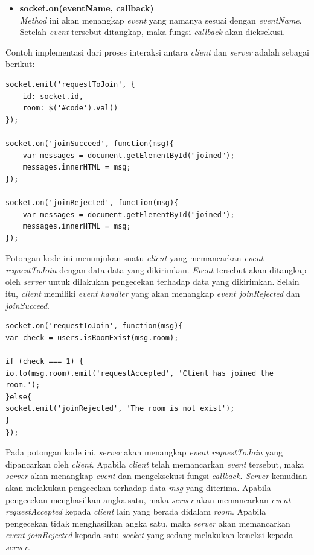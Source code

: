 \begin{enumerate}
\begin{itemize}
		\item \textbf{socket.on(eventName, callback)} \\
		\textit{Method} ini akan menangkap \textit{event} yang namanya sesuai dengan \textit{eventName}. Setelah \textit{event} tersebut ditangkap, maka fungsi \textit{callback} akan dieksekusi.
	\end{itemize}
Contoh implementasi dari proses interaksi antara \textit{client} dan \textit{server} adalah sebagai berikut:
\begin{lstlisting}[caption={potongan kode pada \textit{client}}, label={lst:interaksi_client}, captionpos=b]
socket.emit('requestToJoin', {
	id: socket.id,
	room: $('#code').val()
});

socket.on('joinSucceed', function(msg){
	var messages = document.getElementById("joined");
	messages.innerHTML = msg;
});

socket.on('joinRejected', function(msg){
	var messages = document.getElementById("joined");
	messages.innerHTML = msg;
});
\end{lstlisting}
Potongan kode ini menunjukan suatu \textit{client} yang memancarkan \textit{event requestToJoin} dengan data-data yang dikirimkan. \textit{Event} tersebut akan ditangkap oleh \textit{server} untuk dilakukan pengecekan terhadap data yang dikirimkan. Selain itu, \textit{client} memiliki \textit{event handler} yang akan menangkap \textit{event joinRejected} dan \textit{joinSucceed}.


\begin{lstlisting}[caption={potongan kode pada \textit{server}}, label={lst:interaksi_server}, captionpos=b]
socket.on('requestToJoin', function(msg){
var check = users.isRoomExist(msg.room);

if (check === 1) {
io.to(msg.room).emit('requestAccepted', 'Client has joined the room.');
}else{
socket.emit('joinRejected', 'The room is not exist');
}
});
\end{lstlisting}
Pada potongan kode ini, \textit{server} akan menangkap \textit{event requestToJoin} yang dipancarkan oleh \textit{client}. Apabila \textit{client} telah memancarkan \textit{event} tersebut, maka \textit{server} akan menangkap \textit{event} dan mengeksekusi fungsi \textit{callback}. \textit{Server} kemudian akan melakukan pengecekan terhadap data \textit{msg} yang diterima. Apabila pengecekan menghasilkan angka satu, maka \textit{server} akan memancarkan \textit{event requestAccepted} kepada \textit{client} lain yang berada didalam \textit{room}. Apabila pengecekan tidak menghasilkan angka satu, maka \textit{server} akan memancarkan \textit{event joinRejected} kepada satu \textit{socket} yang sedang melakukan koneksi kepada \textit{server}.


\end{enumerate}
